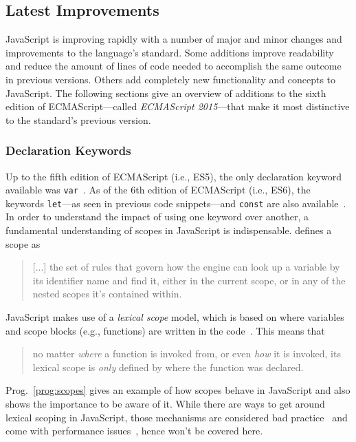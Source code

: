\subsection{Latest Improvements}
\label{sec:latest-improvements}

JavaScript is improving rapidly with a number of major and minor changes and improvements to the language's standard. Some additions improve readability and reduce the amount of lines of code needed to accomplish the same outcome in previous versions. Others add completely new functionality and concepts to JavaScript. The following sections give an overview of additions to the sixth edition of ECMAScript---called \emph{ECMAScript 2015}---that make it most distinctive to the standard's previous version.

\subsubsection{Declaration Keywords}

Up to the fifth edition of ECMAScript (i.e., ES5), the only declaration keyword available was \texttt{var}~\cite[p.~87]{ES5Spec:Ecma:2015}. As of the 6th edition of ECMAScript (i.e., ES6), the keywords \texttt{let}---as seen in previous code snippets---and \texttt{const} are also available~\cite[p.~194]{ES6Spec:Ecma:2015}. In order to understand the impact of using one keyword over another, a fundamental understanding of scopes in JavaScript is indispensable. \citeauthor{YDKJS:ScopesAndClosures:Simpson:2014} defines a scope as 
\begin{quote}
  [...] the set of rules that govern how the engine can look up a variable by its identifier name and find it, either in the current scope, or in any of the nested scopes it’s contained within.~\cite[p.~13]{YDKJS:ScopesAndClosures:Simpson:2014}
\end{quote}
JavaScript makes use of a \emph{lexical scope} model, which is based on where variables and scope blocks (e.g., functions) are written in the code~\cite[p.~13]{YDKJS:ScopesAndClosures:Simpson:2014}. This means that 
\begin{quote}
  no matter \emph{where} a function is invoked from, or even \emph{how} it is invoked, its lexical scope is \emph{only} defined by where the function was declared.~\cite[p.~16]{YDKJS:ScopesAndClosures:Simpson:2014}
\end{quote}
Prog.~\ref{prog:scopes} gives an example of how scopes behave in JavaScript and also shows the importance to be aware of it. While there are ways to get around lexical scoping in JavaScript, those mechanisms are considered bad practice~\cite[p.~14]{YDKJS:ScopesAndClosures:Simpson:2014} and come with performance issues~\cite[p.~21]{YDKJS:ScopesAndClosures:Simpson:2014}, hence won't be covered here.

